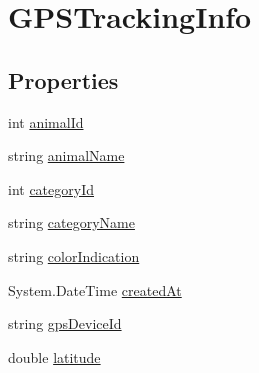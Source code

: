 \hypertarget{classWildLifeTracker_1_1Models_1_1GPSTrackingInfo}{}\section{G\+P\+S\+Tracking\+Info}
\label{classWildLifeTracker_1_1Models_1_1GPSTrackingInfo}
\subsection*{Properties}
\begin{DoxyCompactItemize}
\item 
int \hyperlink{classWildLifeTracker_1_1Models_1_1GPSTrackingInfo_a99787b9867ae390df467a99040589a55}{animal\+Id}
\item 
string \hyperlink{classWildLifeTracker_1_1Models_1_1GPSTrackingInfo_afd38ba6641283469fc9e94212467f9a2}{animal\+Name}
\item 
int \hyperlink{classWildLifeTracker_1_1Models_1_1GPSTrackingInfo_a423f91c56dc35040d661cfbe357f7c78}{category\+Id}
\item 
string \hyperlink{classWildLifeTracker_1_1Models_1_1GPSTrackingInfo_a1eca787c85e1bc45b49bbd281d4106fd}{category\+Name}
\item 
string \hyperlink{classWildLifeTracker_1_1Models_1_1GPSTrackingInfo_a0ecdefcc99a4b41b1ef3a04167756366}{color\+Indication}
\item 
System.\+Date\+Time \hyperlink{classWildLifeTracker_1_1Models_1_1GPSTrackingInfo_a0da6329d5fbb1b91739557ad49ece9c0}{created\+At}
\item 
string \hyperlink{classWildLifeTracker_1_1Models_1_1GPSTrackingInfo_a073b88a9702ca0513fa534f58a048070}{gps\+Device\+Id}
\item 
double \hyperlink{classWildLifeTracker_1_1Models_1_1GPSTrackingInfo_a76714bdbc5c536fa77dfb14533ff82a9}{latitude}

\end{DoxyCompactItemize}
